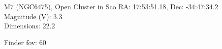 \begin{block}{M7 (NGC6475), Open Cluster in Sco}
    RA: 17:53:51.18, Dec: -34:47:34.2 \\ 
    Magnitude (V): 3.3 \\ 
    Dimensions: 22.2 

    Finder fov: 60 
\end{block}